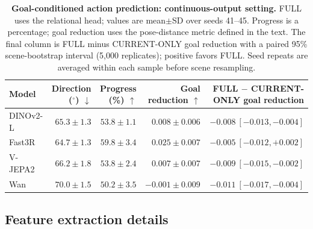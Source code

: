 \documentclass{article} %
\begin{document}
\begin{table}[t]
  \centering
  \caption{\textbf{Goal-conditioned action prediction: continuous-output setting.}
  FULL uses the relational head; values are mean$\pm$SD over seeds 41--45. Progress is a percentage;
  goal reduction uses the pose-distance metric defined in the text.
  The final column is FULL minus CURRENT-ONLY goal reduction with a paired
  95\% scene-bootstrap interval (5,000 replicates); positive favors FULL.
  Seed repeats are averaged within each sample before scene resampling.}
  \label{tab:continuous-action}
  \footnotesize
  \setlength{\tabcolsep}{4pt}
  \begin{tabular}{@{}lrrrr@{}}
    \toprule
    \rowcolor{morandiheader}
    Model & \makecell{Direction ($^{\circ}$)\\$\downarrow$} & \makecell{Progress (\%)\\$\uparrow$} & \makecell{Goal reduction\\$\uparrow$} & \makecell{FULL $-$ CURRENT-ONLY\\goal reduction} \\
    \midrule
    DINOv2-L & $65.3{\pm}1.3$ & $53.8{\pm}1.1$ & $0.008{\pm}0.006$ & $-0.008\ [-0.013,-0.004]$ \\
    Fast3R   & $64.7{\pm}1.3$ & $59.8{\pm}3.4$ & $0.025{\pm}0.007$ & $-0.005\ [-0.012,+0.002]$ \\
    V-JEPA2  & $66.2{\pm}1.8$ & $53.8{\pm}2.4$ & $0.007{\pm}0.007$ & $-0.009\ [-0.015,-0.002]$ \\
    Wan      & $70.0{\pm}1.5$ & $50.2{\pm}3.5$ & $-0.001{\pm}0.009$ & $-0.011\ [-0.017,-0.004]$ \\
    \bottomrule
  \end{tabular}
\end{table}


\subsection{Feature extraction details}
\label{sec:feature-extraction-details}
\end{document}
